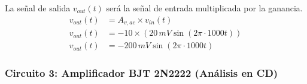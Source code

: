 \documentclass[11pt]{scrartcl}
\begin{document}
La señal de salida $v_{out}(t)$ será la señal de entrada multiplicada por la ganancia.
\begin{align*}
    v_{out}(t) &= A_{v,ac} \times v_{in}(t) \\
    v_{out}(t) &= -10 \times (20 \, mV \sin(2\pi \cdot 1000t)) \\
    v_{out}(t) &= -200 \, mV \sin(2\pi \cdot 1000t)
\end{align*}




\subsubsection{Circuito 3: Amplificador BJT 2N2222 (Análisis en CD)}
\end{document}
